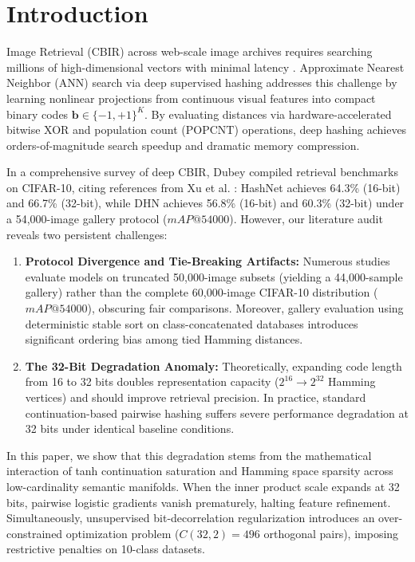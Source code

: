 \documentclass[10pt,conference]{IEEEtran}
\begin{document}
\section{Introduction}
 Image Retrieval (CBIR) across web-scale image archives requires searching millions of high-dimensional vectors with minimal latency \cite{dubey2021decade}. Approximate Nearest Neighbor (ANN) search via deep supervised hashing \cite{wang2017survey} addresses this challenge by learning nonlinear projections from continuous visual features into compact binary codes $\mathbf{b} \in \{-1, +1\}^K$. By evaluating distances via hardware-accelerated bitwise XOR and population count ($\mathrm{POPCNT}$) operations, deep hashing achieves orders-of-magnitude search speedup and dramatic memory compression.

In a comprehensive survey of deep CBIR, Dubey \cite{dubey2021decade} compiled retrieval benchmarks on CIFAR-10, citing references from Xu et al. \cite{xu2019dha}: HashNet \cite{cao2017hashnet} achieves 64.3\% (16-bit) and 66.7\% (32-bit), while DHN \cite{zhu2016deep} achieves 56.8\% (16-bit) and 60.3\% (32-bit) under a 54,000-image gallery protocol ($mAP@54000$). However, our literature audit reveals two persistent challenges:
\begin{enumerate}
    \item \textbf{Protocol Divergence and Tie-Breaking Artifacts:} Numerous studies evaluate models on truncated 50,000-image subsets (yielding a 44,000-sample gallery) rather than the complete 60,000-image CIFAR-10 distribution ($mAP@54000$), obscuring fair comparisons. Moreover, gallery evaluation using deterministic stable sort on class-concatenated databases introduces significant ordering bias among tied Hamming distances.
    \item \textbf{The 32-Bit Degradation Anomaly:} Theoretically, expanding code length from 16 to 32 bits doubles representation capacity ($2^{16} \to 2^{32}$ Hamming vertices) and should improve retrieval precision. In practice, standard continuation-based pairwise hashing suffers severe performance degradation at 32 bits under identical baseline conditions.
\end{enumerate}

In this paper, we show that this degradation stems from the mathematical interaction of tanh continuation saturation and Hamming space sparsity across low-cardinality semantic manifolds. When the inner product scale expands at 32 bits, pairwise logistic gradients vanish prematurely, halting feature refinement. Simultaneously, unsupervised bit-decorrelation regularization introduces an over-constrained optimization problem ($C(32, 2) = 496$ orthogonal pairs), imposing restrictive penalties on 10-class datasets.
\end{document}
